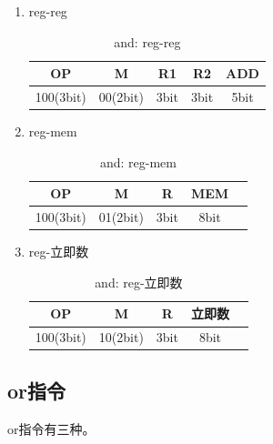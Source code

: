 \documentclass[UTF8]{ctexrep}
\begin{document}
\begin{enumerate}
\item reg-reg
\begin{table}[H]
\centering
\begin{tabular}{|c|c|c|c|c|}
\hline
OP        & M        & R1   & R2   & ADD  \\ \hline
100(3bit) & 00(2bit) & 3bit & 3bit & 5bit \\ \hline
\end{tabular}
\caption{and: reg-reg}
\label{tab:13}
\end{table}

\item reg-mem
\begin{table}[H]
\centering
\begin{tabular}{|c|c|c|c|c|}
\hline
OP        & M        & R    & MEM  \\ \hline
100(3bit) & 01(2bit) & 3bit & 8bit \\ \hline
\end{tabular}
\caption{and: reg-mem}
\label{tab:14}
\end{table}

\item reg-立即数
\begin{table}[H]
\centering
\begin{tabular}{|c|c|c|c|c|}
\hline
OP        & M        & R    & 立即数  \\ \hline
100(3bit) & 10(2bit) & 3bit & 8bit \\ \hline
\end{tabular}
\caption{and: reg-立即数}
\label{tab:15}
\end{table}

\end{enumerate}

\subsection{or指令}
or指令有三种。
\end{document}
